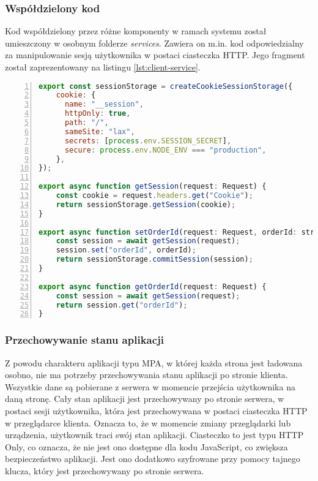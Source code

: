 \subsubsection{Współdzielony kod} 

Kod współdzielony przez różne komponenty w ramach systemu został umieszczony w osobnym folderze \textit{services}. Zawiera on m.in. kod odpowiedzialny za manipulowanie sesją użytkownika w postaci ciasteczka HTTP. Jego fragment został zaprezentowany na listingu \ref{lst:client-service}.

\begin{lstlisting}[caption={Kod funkcji manipulujących sesją użytkownika},label={lst:client-service},captionpos=b,language=JavaScript,numbers=left,showstringspaces=false]
export const sessionStorage = createCookieSessionStorage({
    cookie: {
      name: "__session",
      httpOnly: true,
      path: "/",
      sameSite: "lax",
      secrets: [process.env.SESSION_SECRET],
      secure: process.env.NODE_ENV === "production",
    },
});

export async function getSession(request: Request) {
    const cookie = request.headers.get("Cookie");
    return sessionStorage.getSession(cookie);
}

export async function setOrderId(request: Request, orderId: string) {
    const session = await getSession(request);
    session.set("orderId", orderId);
    return sessionStorage.commitSession(session);
}

export async function getOrderId(request: Request) {
    const session = await getSession(request);
    return session.get("orderId");
}
\end{lstlisting}

\subsubsection{Przechowywanie stanu aplikacji}

Z powodu charakteru aplikacji typu MPA, w której każda strona jest ładowana osobno, nie ma potrzeby przechowywania stanu aplikacji po stronie klienta. Wszystkie dane są pobierane z serwera w momencie przejścia użytkownika na daną stronę. Cały stan aplikacji jest przechowywany po stronie serwera, w postaci sesji użytkownika, która jest przechowywana w postaci ciasteczka HTTP w przeglądarce klienta. Oznacza to, że w momencie zmiany przeglądarki lub urządzenia, użytkownik traci swój stan aplikacji. Ciasteczko to jest typu HTTP Only, co oznacza, że nie jest ono dostępne dla kodu JavaScript, co zwiększa bezpieczeństwo aplikacji. Jest ono dodatkowo szyfrowane przy pomocy tajnego klucza, który jest przechowywany po stronie serwera.